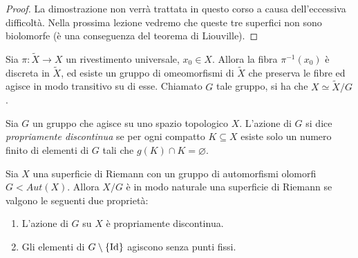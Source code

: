 \begin{proof}
La dimostrazione non verrà trattata in questo corso a causa dell'eccessiva difficoltà.
Nella prossima lezione vedremo che queste tre superfici non sono biolomorfe (è una conseguenza del teorema di Liouville).
\end{proof}
\begin{osservazione}
Sia $\pi:\widetilde{X}\rightarrow X$ un rivestimento universale, $x_0\in X$. Allora la fibra $\pi^{-1}(x_0)$ è discreta in $\widetilde{X}$, ed esiste un gruppo di omeomorfismi di $\widetilde{X}$ che preserva le fibre ed agisce in modo transitivo su di esse. Chiamato $G$ tale gruppo, si ha che $X \simeq \widetilde{X}/G$.
\end{osservazione}
\begin{definizione}
Sia $G$ un gruppo che agisce su uno spazio topologico $X$. L'azione di $G$ si dice \textit{propriamente discontinua} se per ogni compatto $K\subseteq X$ esiste solo un numero finito di elementi di $G$ tali che $g(K)\cap K =\varnothing$.
\end{definizione}
\begin{fatto}
Sia $X$ una superficie di Riemann con un gruppo di automorfismi olomorfi $G<Aut(X)$. Allora $X/G$ è in modo naturale una superficie di Riemann se valgono le seguenti due proprietà:
\begin{enumerate}
  \item L'azione di $G$ su $X$ è propriamente discontinua.
  \item Gli elementi di $G\setminus\{\text{Id}\}$ agiscono senza punti fissi.
\end{enumerate}
\end{fatto}
